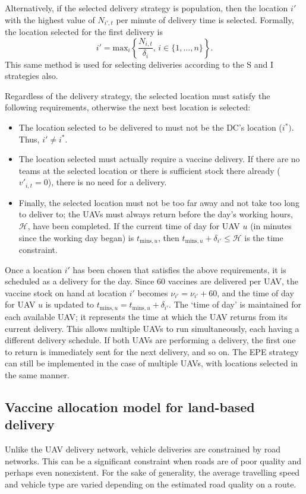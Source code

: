 Alternatively, if the selected delivery strategy is population, then the location $i'$ with the highest value of $N_{i',t}$ per minute of delivery time is selected. Formally, the location selected for the first delivery is $$i' = \text{max}_{i}\left\{ \frac{N_{i,t}}{\delta_{i}}, \, i \in \{1, \dots, n \} \right\}.$$ 
This same method is used for selecting deliveries according to the S and I strategies also.

Regardless of the delivery strategy, the selected location must satisfy the following requirements, otherwise the next best location is selected:
\begin{itemize}
    \item The location selected to be delivered to must not be the DC's location ($i^{*})$. Thus, $i' \neq i^{*}.$
    \item The location selected must actually require a vaccine delivery. If there are no teams at the selected location or there is sufficient stock there already ($v'_{i,t} = 0$), there is no need for a delivery.
    \item Finally, the selected location must not be too far away and not take too long to deliver to; the UAVs must always return before the day's working hours, $\mathcal{H}$, have been completed. If the current time of day for UAV $u$ (in minutes since the working day began) is $t_{\text{mins},u}$, then $t_{\text{mins},u} + \delta_{i'} \leq \mathcal{H}$ is the time constraint.
\end{itemize}

Once a location $i'$ has been chosen that satisfies the above requirements, it is scheduled as a delivery for the day. Since 60 vaccines are delivered per UAV, the vaccine stock on hand at location $i'$ becomes $\nu_{i'} = \nu_{i'} + 60$, and the time of day for UAV $u$ is updated to $t_{\text{mins},u} = t_{\text{mins},u} + \delta_{i'}$. The `time of day' is maintained for each available UAV; it represents the time at which the UAV returns from its current delivery. This allows multiple UAVs to run simultaneously, each having a different delivery schedule. If both UAVs are performing a delivery, the first one to return is immediately sent for the next delivery, and so on. The EPE strategy can still be implemented in the case of multiple UAVs, with locations selected in the same manner.

\subsection{Vaccine allocation model for land-based delivery} 
\label{sec:veh_dels}
Unlike the UAV delivery network, vehicle deliveries are constrained by road networks. This can be a significant constraint when roads are of poor quality and perhaps even nonexistent. For the sake of generality, the average travelling speed and vehicle type are varied depending on the estimated road quality on a route. 

